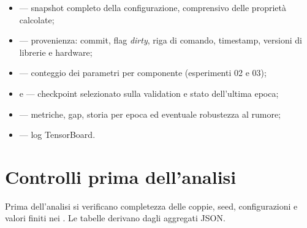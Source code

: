 \begin{itemize}
  \item {} --- snapshot completo della configurazione, comprensivo
    delle proprietà calcolate;
  \item {} --- provenienza: commit, flag \emph{dirty},
    riga di comando, timestamp, versioni di librerie e hardware;
  \item {} --- conteggio dei parametri per componente
    (esperimenti 02 e 03);
  \item {} e  --- checkpoint
    selezionato sulla validation e stato dell'ultima epoca;
  \item {} --- metriche, gap, storia per epoca ed eventuale
    robustezza al rumore;
  \item {} --- log TensorBoard.
\end{itemize}

\section{Controlli prima dell'analisi}

Prima dell'analisi si verificano completezza delle coppie, seed, configurazioni e
valori finiti nei . Le tabelle derivano dagli aggregati JSON.
